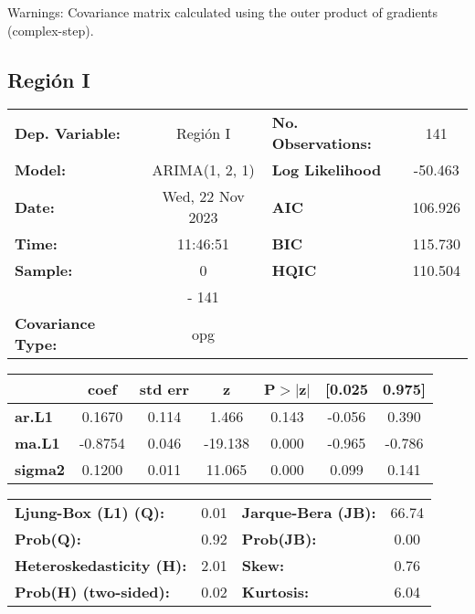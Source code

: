 \documentclass{article}%
\begin{document}
Warnings: \newline
 [1] Covariance matrix calculated using the outer product of gradients (complex-step).%
\subsection*{Región I}%
\begin{center}
\begin{tabular}{lclc}
\toprule
\textbf{Dep. Variable:}          &     Región I     & \textbf{  No. Observations:  } &    141      \\
\textbf{Model:}                  &  ARIMA(1, 2, 1)  & \textbf{  Log Likelihood     } &  -50.463    \\
\textbf{Date:}                   & Wed, 22 Nov 2023 & \textbf{  AIC                } &  106.926    \\
\textbf{Time:}                   &     11:46:51     & \textbf{  BIC                } &  115.730    \\
\textbf{Sample:}                 &        0         & \textbf{  HQIC               } &  110.504    \\
\textbf{}                        &       - 141      & \textbf{                     } &             \\
\textbf{Covariance Type:}        &       opg        & \textbf{                     } &             \\
\bottomrule
\end{tabular}
\begin{tabular}{lcccccc}
                & \textbf{coef} & \textbf{std err} & \textbf{z} & \textbf{P$> |$z$|$} & \textbf{[0.025} & \textbf{0.975]}  \\
\midrule
\textbf{ar.L1}  &       0.1670  &        0.114     &     1.466  &         0.143        &       -0.056    &        0.390     \\
\textbf{ma.L1}  &      -0.8754  &        0.046     &   -19.138  &         0.000        &       -0.965    &       -0.786     \\
\textbf{sigma2} &       0.1200  &        0.011     &    11.065  &         0.000        &        0.099    &        0.141     \\
\bottomrule
\end{tabular}
\begin{tabular}{lclc}
\textbf{Ljung-Box (L1) (Q):}     & 0.01 & \textbf{  Jarque-Bera (JB):  } & 66.74  \\
\textbf{Prob(Q):}                & 0.92 & \textbf{  Prob(JB):          } &  0.00  \\
\textbf{Heteroskedasticity (H):} & 2.01 & \textbf{  Skew:              } &  0.76  \\
\textbf{Prob(H) (two-sided):}    & 0.02 & \textbf{  Kurtosis:          } &  6.04  \\
\bottomrule
\end{tabular}
\end{center}
\end{document}
